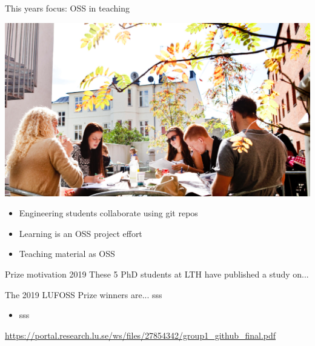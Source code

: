 \documentclass[aspectratio=169]{beamer}
\newenvironment{Slide}[1]%
  {\begin{frame}[environment=Slide]{#1}}
  {\end{frame}}%
\begin{document}
\begin{Slide}{This years focus: OSS in teaching}
\begin{minipage}{0.5\textwidth}
  \includegraphics[width=1.0\textwidth]{Pictures/titlepictureGroup}
\end{minipage}%
\begin{minipage}{0.5\textwidth}
  \begin{itemize}
    \item Engineering students collaborate using git repos
    \item Learning is an OSS project effort
    \item Teaching material as OSS
  \end{itemize}
\end{minipage}

  \end{Slide}

\begin{Slide}{Prize motivation 2019}
These 5 PhD students at LTH have published a study on... 
\end{Slide}

\begin{Slide}{The 2019 LUFOSS Prize winners are...}
sss \pause
\begin{itemize}
  \item sss
\end{itemize} 
\url{https://portal.research.lu.se/ws/files/27854342/group1_github_final.pdf}
\end{Slide}
\end{document}
